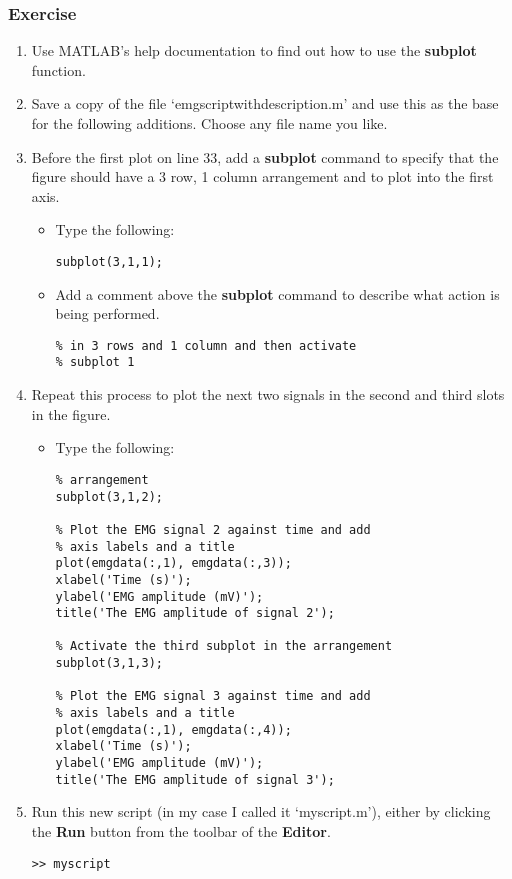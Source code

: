 \documentclass[12pt,a4paper]{article}
\begin{document}
\subsubsection*{Exercise}
\begin{enumerate}
	\item Use MATLAB's help documentation to find out how to use the \textbf{subplot} function.	
	\item Save a copy of the file `emgscriptwithdescription.m' and use this as the base for the following additions.  Choose any file name you like.
	\item Before the first plot on line 33, add a \textbf{subplot} command to specify that the figure should have a 3 row, 1 column arrangement and to plot into the first axis.
	\begin{itemize}
		\item Type the following:
		\begin{lstlisting}[style=Matlab-editor]
subplot(3,1,1);
		\end{lstlisting}	
		\item Add a comment above the \textbf{subplot} command to describe what action is being performed.
		\begin{lstlisting}[style=Matlab-editor]
% Setup the figure to have subplots arranged 
% in 3 rows and 1 column and then activate 
% subplot 1
		\end{lstlisting}		
	\end{itemize}
	\item Repeat this process to plot the next two signals in the second and third slots in the figure.
	\begin{itemize}
		\item Type the following:
		\begin{lstlisting}[style=Matlab-editor]
% Activate the second subplot in the 
% arrangement
subplot(3,1,2);

% Plot the EMG signal 2 against time and add 
% axis labels and a title
plot(emgdata(:,1), emgdata(:,3));
xlabel('Time (s)');
ylabel('EMG amplitude (mV)');
title('The EMG amplitude of signal 2');

% Activate the third subplot in the arrangement
subplot(3,1,3);

% Plot the EMG signal 3 against time and add 
% axis labels and a title
plot(emgdata(:,1), emgdata(:,4));
xlabel('Time (s)');
ylabel('EMG amplitude (mV)');
title('The EMG amplitude of signal 3');
		\end{lstlisting}		
	\end{itemize}
	\item Run this new script (in my case I called it `myscript.m'), either by clicking the \textbf{Run} button from the toolbar of the \textbf{Editor}.
	\begin{lstlisting}[style=Matlab-editor]
>> myscript
	\end{lstlisting}
\end{enumerate}
\end{document}
